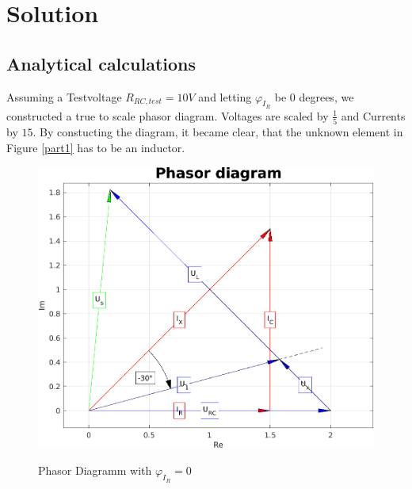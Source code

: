 \documentclass[a4paper]{article}
\begin{document}
\section{Solution}
\subsection{Analytical calculations}
Assuming a Testvoltage $R_{RC, test} = 10V$ and letting $\varphi_{I_{R}}$ be $0$ degrees, we
constructed a true to scale phasor diagram. Voltages are scaled by  $\frac{1}{5}$ and Currents by
$15$. By constucting the diagram, it became clear, that the unknown element in Figure \ref{part1}
has to be an inductor.

\begin{figure}[h!]
	\centering
	\includegraphics[scale=0.8]{./Figures/phasors_1.png}
	\label{phasor_dia_1}
	\caption{Phasor Diagramm with $\varphi_{I_{R}} = 0$}
\end{figure}
\end{document}
